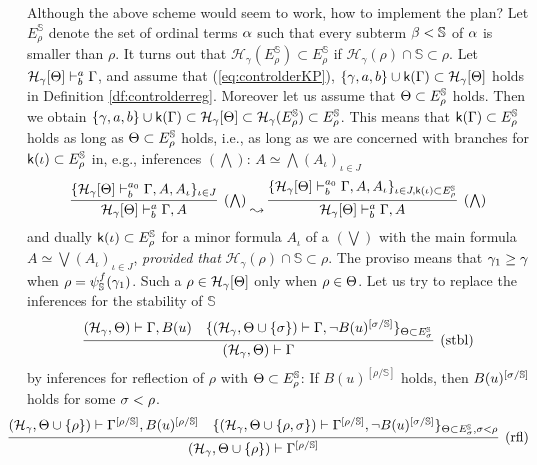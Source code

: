 \documentclass{article}
\newcommand{\mS}{\mathbb{S}}
\begin{document}
Although the above scheme would seem to work, how to implement the plan?
Let $E^{\mS}_{\rho}$ denote the set of ordinal terms $\alpha$ such that
every subterm $\bet<\mS$ of $\alpha$ is smaller than $\rho$.
It turns out that 
$\mathcal{H}_{\gamma}(E^{\mathbb{S}}_{\rho})\subset E^{\mathbb{S}}_{\rho}$
if $\mathcal{H}_{\gamma}(\rho)\cap\mathbb{S}\subset\rho$.
Let ${\cal H}_{\gamma}[\Theta]\vdash^{a}_{b}\Gamma$, and
assume that (\ref{eq:controlderKP}), $\{\gamma,a,b\}\cup{\sf k}(\Gamma)\subset{\cal H}_{\gamma}[\Theta]$
holds in Definition \ref{df:controlderreg}.
Moreover let us assume that $\Tht\subset E^{\mS}_{\rho}$ holds.
Then we obtain
$\{\gam,a,b\}\cup\sfk(\Gam)\subset\calh_{\gam}[\Tht]\subset\calh_{\gam}(E^{\mS}_{\rho})\subset E^{\mS}_{\rho}$.
This means that $\sfk(\Gam)\subset E^{\mS}_{\rho}$ holds
as long as $\Tht\subset E^{\mS}_{\rho}$ holds, i.e., as long as
we are concerned with branches for $\sfk(\iota)\subset E^{\mS}_{\rho}$
in, e.g., inferences $(\bigwedge)$: $A\simeq\bigwedge(A_{\iota})_{\iota\in J}$
\[
\infer[(\bigwedge)]{\calh_{\gam}[\Tht]\vdash^{a}_{b}\Gam,A}
{
\{
\calh_{\gam}[\Tht]\vdash^{a_{0}}_{b}\Gam,A, A_{\iota}
\}_{\iota\in J}
}
\leadsto
\infer[(\bigwedge)]{\calh_{\gam}[\Tht]\vdash^{a}_{b}\Gam,A}
{
\{
\calh_{\gam}[\Tht]\vdash^{a_{0}}_{b}\Gam,A, A_{\iota}
\}_{\iota\in J, \sfk(\iota)\subset E^{\mS}_{\rho}}
}
\]
and dually $\sfk(\iota)\subset E^{\mS}_{\rho}$ for a minor formula $A_{\iota}$
of a $(\bigvee)$ with the main formula $A\simeq\bigvee(A_{\iota})_{\iota\in J}$,
\textit{provided that} 
$\mathcal{H}_{\gamma}(\rho)\cap\mathbb{S}\subset\rho$.
The proviso means that $\gamma_{1}\geq\gamma$ when $\rho=\psi_{\mS}^{f}(\gam_{1})$.
Such a $\rho\in{\cal H}_{\gamma}[\Theta]$ only when $\rho\in\Theta$.
Let us try to replace the inferences for the stability of $\mS$
\[
\infer[({\rm stbl})]{(\mathcal{H}_{\gamma},\Theta
)
\vdash
\Gamma
}
{
(\mathcal{H}_{\gamma},\Theta
)\vdash
\Gamma, B(u)
&
\{
(\mathcal{H}_{\gamma},\Theta\cup\{\sigma\}
)
\vdash
\Gamma, \lnot B(u)^{[\sigma/\mathbb{S}]}
\}_{\Theta\subset E^{\mathbb{S}}_{\sigma}}
}
\]
by inferences for reflection of $\rho$ with $\Tht\subset E^{\mS}_{\rho}$:
If $B(u)^{[\rho/\mS]}$ holds, then $B(u)^{[\sig/\mS]}$ holds for some $\sigma<\rho$.
{\small
\[
\hspace{-5mm}
\infer[({\rm rfl})]{(\mathcal{H}_{\gamma},\Theta\cup\{\rho\}
)
\vdash
\Gamma^{[\rho/\mS]}
}
{
(\mathcal{H}_{\gamma},\Theta\cup\{\rho\}
)\vdash
\Gamma^{[\rho/\mS]}, B(u)^{[\rho/\mS]}
&
\{
(\mathcal{H}_{\gamma},\Theta\cup\{\rho,\sigma\}
)
\vdash
\Gamma^{[\rho/\mS]}, \lnot B(u)^{[\sigma/\mathbb{S}]}
\}_{\Theta\subset E^{\mathbb{S}}_{\sigma},\sig<\rho}
}
\]
}
\end{document}
